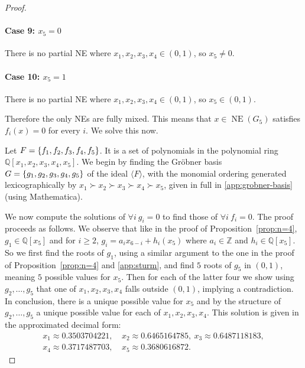 \documentclass[preprint,12pt,authoryear]{elsarticle}
\newcommand{\Z}{\mathbb{Z}}
\newcommand{\Q}{\mathbb{Q}}
\DeclarePairedDelimiter{\ios}{\{}{\}}
\newcommand{\s}{\ios*}
\DeclareMathOperator{\NE}{NE}
\begin{document}
\begin{proof}
  \paragraph{Case 9: $x_5=0$} There is no partial NE where $x_1,x_2,x_3,x_4\in(0,1)$, so 
  $x_5\ne0$.

  \paragraph{Case 10: $x_5=1$} There is no partial NE where $x_1,x_2,x_3,x_4\in(0,1)$, so 
  $x_5\in(0,1)$.

  \bigskip

  Therefore the only NEs are fully mixed. This means that $x\in\NE(G_5)$ satisfies 
  $f_i(x)=0$ for every $i$. We solve this now.

  Let $F=\s{f_1,f_2,f_3,f_4,f_5}$. It is a set of polynomials in the polynomial ring 
  $\Q[x_1,x_2,x_3,x_4,x_5]$. We begin by finding the Gr\"obner basis 
  $G=\s{g_1,g_2,g_3,g_4,g_5}$ of the ideal $\langle F\rangle$, with the monomial ordering 
  generated lexicographically by $x_1\succ x_2\succ x_3\succ x_4\succ x_5$, given in full 
  in \ref{app:grobner-basis} (using Mathematica).


  We now compute the solutions of $\forall i~g_i=0$ to find those of $\forall i~f_i=0$. The proof proceeds as follows. We observe that like in the proof of Proposition~\ref{prop:n=4}, $g_1\in\Q[x_5]$ and for $i\ge2$, $g_i=a_ix_{6-i}+h_i(x_5)$ where $a_i\in\Z$ and $h_i\in\Q[x_5]$. So we first find the roots of $g_1$, using a similar argument to the one in the proof of Proposition~\ref{prop:n=4} and \ref{app:sturm}, and find $5$ roots of $g_5$ in $(0,1)$, meaning $5$ possible values for $x_5$. Then for each of the latter four we show using $g_2,\ldots,g_5$ that one of $x_1,x_2,x_3,x_4$ falls outside $(0,1)$, implying a contradiction. In conclusion, there is a unique possible value for $x_5$ and by the structure of $g_2,\ldots,g_5$ a unique possible value for each of $x_1,x_2,x_3,x_4$.
  This solution is given in the 
  approximated decimal form:
  \begin{align*}
    x_1\approx0.3503704221,&~x_2\approx0.6465164785,~x_3\approx0.6487118183,\\
    x_4\approx0.3717487703,&~x_5\approx0.3680616872.
  \end{align*}


\end{proof}
\end{document}
